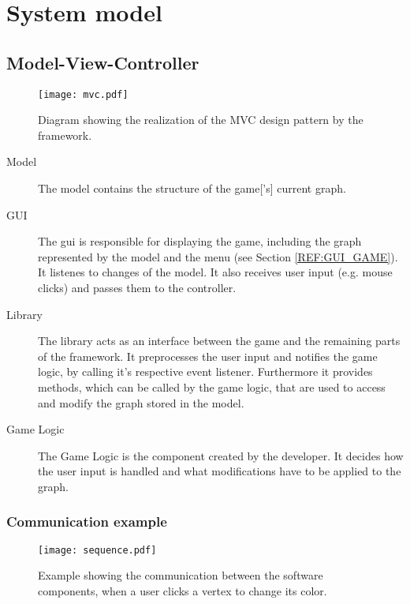 \section{System model}

\subsection{Model-View-Controller}


\begin{figure}[h]
	\centering
	\texttt{[image: mvc.pdf]}
	\caption{Diagram showing the realization of the \gls{MVC} design pattern by the framework.}
	\label{img:MVC}
\end{figure}

\begin{description}
	\item[Model] The model contains the structure of the \gls{game}['s] current \gls{graph}.
	\item[GUI] The \gls{gui} is responsible for displaying the game, including the \gls{graph} represented by the model and the menu (see Section \ref{REF:GUI_GAME}). It listenes to changes of the model. It also receives user input (e.g. mouse clicks) and passes them to the controller.
	\item[Library] The library acts as an interface between the game and the remaining parts of the framework. It preprocesses the user input and notifies the game logic, by calling it's respective event listener. Furthermore it provides methods, which can be called by the game logic, that are used to access and modify the \gls{graph} stored in the model.
	\item[Game Logic] The Game Logic is the component created by the \gls{developer}. It decides how the user input is handled and what modifications have to be applied to the \gls{graph}. 
\end{description}

\subsubsection{Communication example}
\begin{figure}[h!]
	\centering
	\texttt{[image: sequence.pdf]}
	\caption{Example showing the communication between the software components, when a user clicks a vertex to change its color.}
	\label{img:SEQ}
\end{figure}
